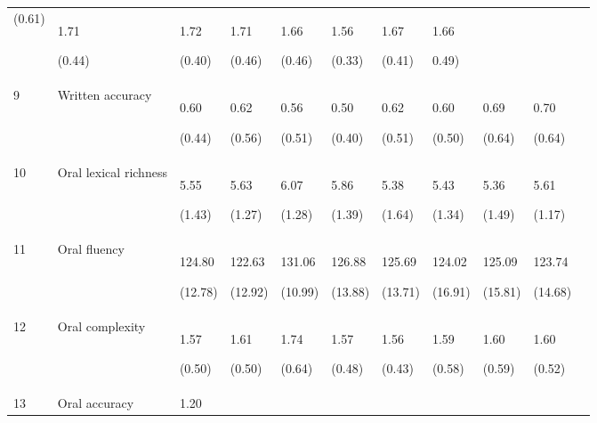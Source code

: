 \documentclass[output=paper,modfonts,nonflat,newtxmath]{langsci/langscibook}
\begin{document}
\begin{table}
{\begin{tabularx}{\textwidth}{l p{4cm} YYYYYYYYY}
 (0.61) & { 1.71}

 (0.44) & { 1.72}

 (0.40) & { 1.71}

 (0.46) & { 1.66}

 (0.46) & { 1.56}

 (0.33) & { 1.67}

 (0.41) & { 1.66}

 0.49)\\
 9 & Written accuracy & { 0.60}

 (0.44) & { 0.62}

 (0.56) & { 0.56}

 (0.51) & { 0.50}

 (0.40) & { 0.62}

 (0.51) & { 0.60}

 (0.50) & { 0.69}

 (0.64) & { 0.70}

 (0.64)\\
 10 & Oral lexical richness & { 5.55}

 (1.43) & { 5.63}

 (1.27) & { 6.07}

 (1.28) & { 5.86}

 (1.39) & { 5.38}

 (1.64) & { 5.43}

 (1.34) & { 5.36}

 (1.49) & { 5.61}

 (1.17)\\
 11 & Oral fluency & { 124.80}

 (12.78) & { 122.63}

 (12.92) & { 131.06}

 (10.99) & { 126.88}

 (13.88) & { 125.69}

 (13.71) & { 124.02}

 (16.91) & { 125.09}

 (15.81) & { 123.74}

 (14.68)\\
 12 & Oral complexity & { 1.57}

 (0.50) & { 1.61}

 (0.50) & { 1.74}

 (0.64) & { 1.57}

 (0.48) & { 1.56}

 (0.43) & { 1.59}

 (0.58) & { 1.60}

 (0.59) & { 1.60}

 (0.52)\\
 13 & Oral accuracy & { 1.20}


\end{tabularx}}
\end{table}
\end{document}
